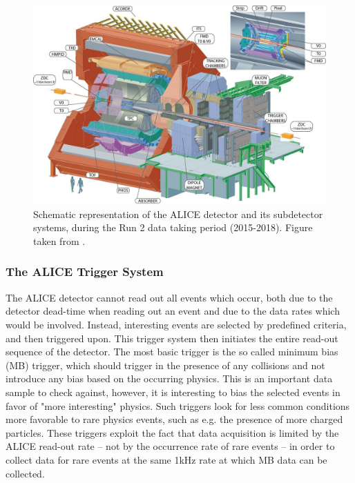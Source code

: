 \begin{figure}
    \centering
    \includegraphics[width=\textwidth]{figures/ALICE_figure.jpeg}
    \caption{Schematic representation of the ALICE detector and its subdetector systems, during the Run 2 data taking period (2015-2018). Figure taken from \cite{}.}
    \label{fig:ALICE}
\end{figure}

\subsubsection{The ALICE Trigger System}
The ALICE detector cannot read out all events which occur, both due to the detector dead-time when reading out an event and due to the data rates which would be involved. Instead, interesting events are selected by predefined criteria, and then triggered upon. This trigger system then initiates the entire read-out sequence of the detector. The most basic trigger is the so called minimum bias (MB) trigger, which should trigger in the presence of any collisions and not introduce any bias based on the occurring physics. This is an important data sample to check against, however, it is interesting to bias the selected events in favor of "more interesting" physics. Such triggers look for less common conditions more favorable to rare physics events, such as e.g. the presence of more charged particles. These triggers exploit the fact that data acquisition is limited by the ALICE read-out rate -- not by the occurrence rate of rare events -- in order to collect data for rare events at the same 1kHz rate at which MB data can be collected. \\

